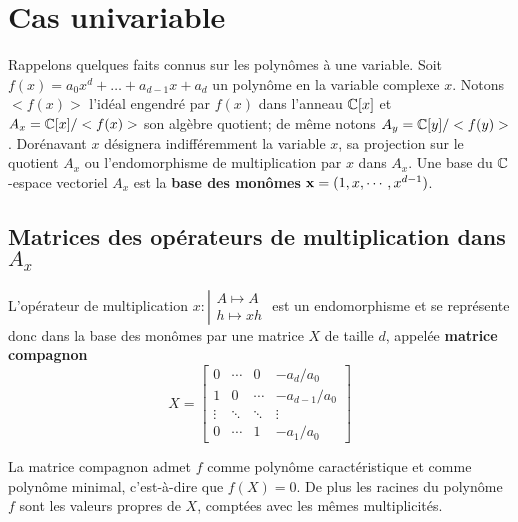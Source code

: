 \documentclass{standalone}
\begin{document}
\section{Cas univariable}
\label{univariable}
\cite{jp_code}
Rappelons quelques faits connus sur les polynômes à une variable.
Soit $f(x) = a_0x^d + \dots + a_{d-1}x + a_d$ un polynôme en la variable complexe $x$. Notons $<f(x)>$ l'idéal engendré par $f(x)$ dans l'anneau $\mathbb{C}[x]$ et $A_x = \mathbb{C}[x]/<f(x)>$  son algèbre quotient; de même notons $A_y = \mathbb{C}[y]/<f(y)>$. Dorénavant $x$ désignera indifféremment la variable $x$, sa projection sur le quotient $A_x$ ou l'endomorphisme de multiplication par $x$ dans $A_x$. Une base du $\mathbb{C}$-espace vectoriel $A_x$ est la {\bf base des monômes} $\bold{x} = (1, x,\cdots, x^{d-1})$.

\subsection{Matrices des opérateurs de multiplication dans $A_x$}
L'opérateur de multiplication
$x : \left\vert
\begin{array}{c}
A \mapsto A \\
h \mapsto xh
\end{array}
\right.$
est un endomorphisme et se représente donc dans la base des monômes par une matrice $X$ de taille $d$, appelée {\bf matrice compagnon}
\begin{equation}
\label{compan}
X =
\begin{bmatrix}
	0 & \cdots & 0 & -a_d/a_0 \\
	1 & 0 & \cdots & -a_{d-1}/a_0 \\
	\vdots  & \ddots  & \ddots & \vdots  \\
	0 & \cdots & 1 & -a_1/a_0
\end{bmatrix}
\end{equation}

\begin{prop}
\label{compan2roots}
La matrice compagnon admet $f$ comme polynôme caractéristique et comme polynôme minimal, c'est-à-dire que $f(X) = 0$. De plus les racines du polynôme $f$ sont les valeurs propres de $X$, comptées avec les mêmes multiplicités.
\end{prop}
\end{document}
